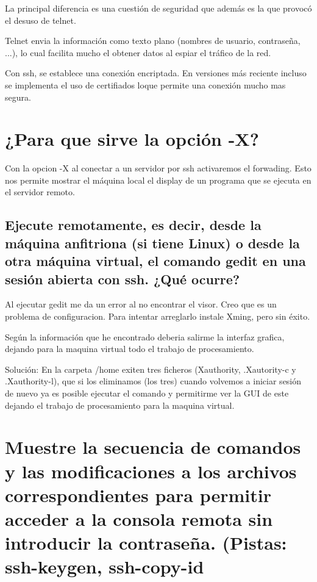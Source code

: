 La principal diferencia es una  cuestión de seguridad que además es la que provocó el desuso de telnet.

Telnet envia la información como texto plano (nombres de usuario, contraseña, ...), lo cual facilita mucho el obtener datos al espiar el tráfico de la red.

Con ssh, se establece una conexión encriptada. En versiones más reciente incluso se implementa el uso de certifiados loque permite una conexión mucho mas segura.

\cite{E7}


\section{¿Para que sirve la opción -X?}
Con la opcion -X al conectar a un servidor por ssh activaremos el forwading. Esto nos permite mostrar el máquina local el display de un programa que se ejecuta en el servidor remoto.


\cite{E8}

\subsection{Ejecute remotamente, es decir, desde la máquina anfitriona (si tiene Linux) o desde la otra máquina virtual, el comando gedit en una sesión abierta con ssh. ¿Qué ocurre? }

Al ejecutar gedit me da un error al no encontrar el visor. Creo que es un problema de configuracion.
Para intentar arreglarlo instale Xming, pero sin éxito.

Según la información que he encontrado deberia salirme la interfaz grafica, dejando para la maquina virtual todo el trabajo de procesamiento.

Solución: En la carpeta /home exiten tres ficheros (Xauthority, .Xautority-c y .Xauthority-l), que si los eliminamos (los tres) cuando volvemos a iniciar sesión de nuevo ya es posible ejecutar el comando y permitirme ver la GUI de este dejando el trabajo de procesamiento  para la maquina virtual.

\cite{E9}


\section{Muestre la secuencia de comandos y las modificaciones a los archivos correspondientes para permitir acceder a la consola remota sin introducir la contraseña. (Pistas: ssh-keygen, ssh-copy-id}

